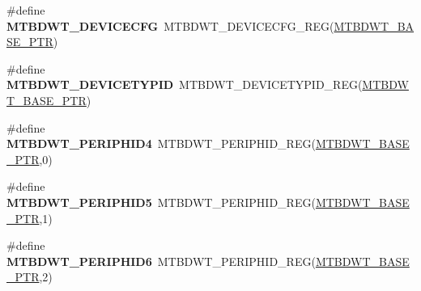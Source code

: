 \begin{DoxyCompactItemize}
\item 
\mbox{\label{group___m_t_b_d_w_t___register___accessor___macros_ga5d85a355ea3763f3ce91c860b33ecd40}} 
\#define {\bfseries M\+T\+B\+D\+W\+T\+\_\+\+D\+E\+V\+I\+C\+E\+C\+FG}~M\+T\+B\+D\+W\+T\+\_\+\+D\+E\+V\+I\+C\+E\+C\+F\+G\+\_\+\+R\+EG(\hyperlink{group___m_t_b_d_w_t___peripheral_ga97d048bfb5a11293a38c444b8347ff42}{M\+T\+B\+D\+W\+T\+\_\+\+B\+A\+S\+E\+\_\+\+P\+TR})
\item 
\mbox{\label{group___m_t_b_d_w_t___register___accessor___macros_gae3c0de787e5ffb8689542299ac138e16}} 
\#define {\bfseries M\+T\+B\+D\+W\+T\+\_\+\+D\+E\+V\+I\+C\+E\+T\+Y\+P\+ID}~M\+T\+B\+D\+W\+T\+\_\+\+D\+E\+V\+I\+C\+E\+T\+Y\+P\+I\+D\+\_\+\+R\+EG(\hyperlink{group___m_t_b_d_w_t___peripheral_ga97d048bfb5a11293a38c444b8347ff42}{M\+T\+B\+D\+W\+T\+\_\+\+B\+A\+S\+E\+\_\+\+P\+TR})
\item 
\mbox{\label{group___m_t_b_d_w_t___register___accessor___macros_ga8ef257fe5f8d95bd784008c0fed9375e}} 
\#define {\bfseries M\+T\+B\+D\+W\+T\+\_\+\+P\+E\+R\+I\+P\+H\+I\+D4}~M\+T\+B\+D\+W\+T\+\_\+\+P\+E\+R\+I\+P\+H\+I\+D\+\_\+\+R\+EG(\hyperlink{group___m_t_b_d_w_t___peripheral_ga97d048bfb5a11293a38c444b8347ff42}{M\+T\+B\+D\+W\+T\+\_\+\+B\+A\+S\+E\+\_\+\+P\+TR},0)
\item 
\mbox{\label{group___m_t_b_d_w_t___register___accessor___macros_ga784ae33118477a2b68ce261e0caf4b85}} 
\#define {\bfseries M\+T\+B\+D\+W\+T\+\_\+\+P\+E\+R\+I\+P\+H\+I\+D5}~M\+T\+B\+D\+W\+T\+\_\+\+P\+E\+R\+I\+P\+H\+I\+D\+\_\+\+R\+EG(\hyperlink{group___m_t_b_d_w_t___peripheral_ga97d048bfb5a11293a38c444b8347ff42}{M\+T\+B\+D\+W\+T\+\_\+\+B\+A\+S\+E\+\_\+\+P\+TR},1)
\item 
\mbox{\label{group___m_t_b_d_w_t___register___accessor___macros_gac164f79edd8679be62049881e3e01e68}} 
\#define {\bfseries M\+T\+B\+D\+W\+T\+\_\+\+P\+E\+R\+I\+P\+H\+I\+D6}~M\+T\+B\+D\+W\+T\+\_\+\+P\+E\+R\+I\+P\+H\+I\+D\+\_\+\+R\+EG(\hyperlink{group___m_t_b_d_w_t___peripheral_ga97d048bfb5a11293a38c444b8347ff42}{M\+T\+B\+D\+W\+T\+\_\+\+B\+A\+S\+E\+\_\+\+P\+TR},2)
\item 

\end{DoxyCompactItemize}
